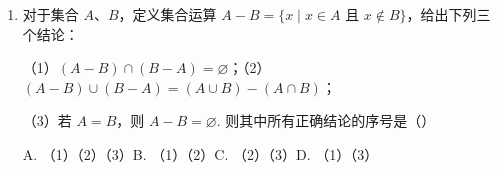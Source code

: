 \documentclass[a4paper,11pt]{article}
\begin{document}
\begin{enumerate}
\item 对于集合 $A$、$B$，定义集合运算 $A-B=\{x\mid x\in A$ 且 $x\notin B\}$，给出下列三个结论：

（1）$(A-B)\cap(B-A)=\varnothing$；（2）$(A-B)\cup(B-A)=(A\cup B)-(A\cap B)$；

（3）若 $A=B$，则 $A-B=\varnothing$. 则其中所有正确结论的序号是\mbox{（\quad）}

\keepwithprev
A. （1）（2）（3）\qquad B. （1）（2）\qquad C. （2）（3）\qquad D. （1）（3）

\ifanswer
\solbegin
{}
\solend
\fi

\end{enumerate}

\end{document}
